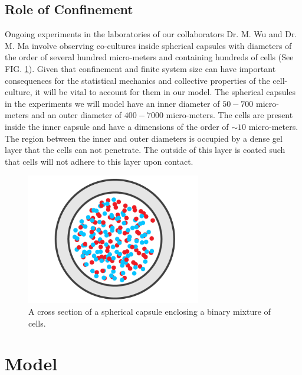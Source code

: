 \documentclass[aps,prb,twocolumn,groupedaddress,nofootinbib,floatfix]{revtex4}
\begin{document}
\subsection{Role of Confinement}

Ongoing experiments in the laboratories of our collaborators Dr. M. Wu and Dr. M. Ma involve observing co-cultures inside spherical capsules with diameters of the order of several hundred micro-meters 
and containing hundreds of cells\cite{Alessandri} (See FIG. \ref{fig:capsule}). Given that confinement and finite system size can have important consequences for the statistical mechanics and collective 
properties of the cell-culture, it will be vital to account for them in our model. The spherical capsules in the experiments we will model have an inner diameter of $50-700$ micro-meters and an outer diameter of $400-7000$ micro-meters.
The cells are present inside the inner capsule and have a dimensions of the order of $\sim 10$ micro-meters. The region between the inner and outer diameters is occupied by a dense gel layer that the cells can not penetrate.
The outside of this layer is coated such that cells will not adhere to this layer upon contact. \\

\begin{figure}
  \includegraphics[width=3in]{Fig1.png}
  \caption[capsule]
   {A cross section of a spherical capsule enclosing a binary mixture of 
   cells.}
   \label{fig:capsule}
\end{figure}


\section*{Model}
\end{document}
